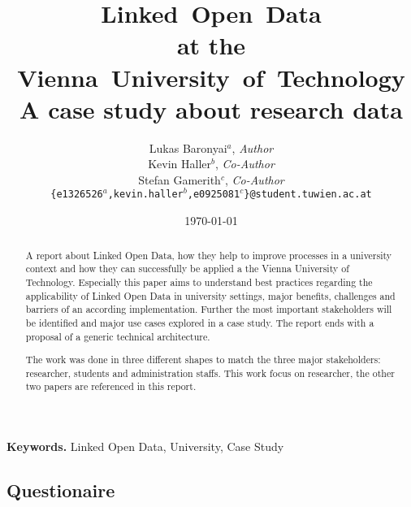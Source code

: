 \documentclass[pdftex,a4paper,10pt]{article}
\begin{document}
\pagestyle{plain}
\setlength{\tabcolsep}{10pt}
\title{\textbf{L}inked~\textbf{O}pen~\textbf{D}ata\\
	   at the\\
	   Vienna~University~of~Technology\\
	   \large A case study about research data}
\author{Lukas Baronyai$^a$, \textit{Author}\\
		Kevin Haller$^b$, \textit{Co-Author}\\
		Stefan Gamerith$^c$, \textit{Co-Author}\\
	\texttt{\{e1326526$^a$,kevin.haller$^b$,e0925081$^c$\}@student.tuwien.ac.at}}
\date{\today}

\maketitle

\begin{abstract}
A report about Linked Open Data, how they help to improve processes in a university context and how they can successfully be applied a the Vienna University of Technology. Especially this paper aims to understand best practices regarding the applicability of Linked Open Data in university settings, major benefits, challenges and barriers of an according implementation. Further the most important stakeholders will be identified and major use cases explored in a case study. The report ends with a proposal of a generic technical architecture.

The work was done in three different shapes to match the three major stakeholders: researcher, students and administration staffs. This work focus on researcher, the other two papers are referenced in this report.
\end{abstract}

\vfill
\begin{center}
\textbf{Keywords.} Linked Open Data, University, Case Study
\end{center}

\newpage
\tableofcontents
\cleardoublepage
\listoffigures
{}








\cleardoublepage
{}
{}


\newpage

\begin{appendices}
	\subsection{Questionaire}
	
	\newpage
	
	\newpage
\end{appendices}
\end{document}
